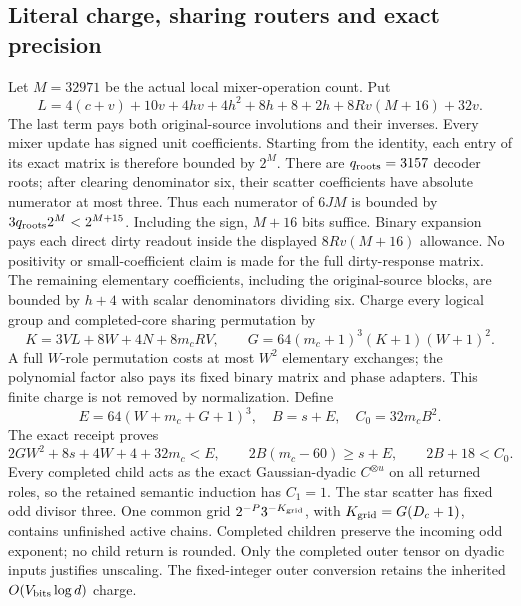 \subsection{Literal charge, sharing routers and exact precision}
Let $M=32971$ be the actual local mixer-operation count. Put
\[
 L=4(c+v)+10v+4hv+4h^2+8h+8+2h
       +8Rv(M+16)+32v.
\]
The last term pays both original-source involutions and their inverses.
Every mixer update has signed unit coefficients. Starting from the identity,
each entry of its exact matrix is therefore bounded by $2^M$.
There are $q_{\rm roots}=3157$ decoder roots; after clearing denominator
six, their scatter coefficients have absolute numerator at most three.
Thus each numerator of $6JM$ is bounded by
$3q_{\rm roots}2^M<2^{M+15}$. Including the sign, $M+16$ bits suffice.
Binary expansion pays each direct dirty readout inside the displayed
$8Rv(M+16)$ allowance. No positivity or small-coefficient claim is made
for the full dirty-response matrix. The remaining elementary coefficients,
including the original-source blocks, are bounded by $h+4$ with
scalar denominators dividing six.
Charge every logical group and completed-core sharing permutation by
\[
 K=3VL+8W+4N+8m_cRV,\qquad
 G=64(m_c+1)^3(K+1)(W+1)^2.
\]
A full $W$-role permutation costs at most $W^2$ elementary exchanges;
the polynomial factor also pays its fixed binary matrix and phase
adapters. This finite charge is not removed by normalization.
Define
\[
 E=64(W+m_c+G+1)^3,\quad B=s+E,\quad C_0=32m_cB^2.
\]
The exact receipt proves
\[
 2GW^2+8s+4W+4+32m_c<E,\qquad
 2B(m_c-60)\ge s+E,\qquad 2B+18<C_0.
\]
Every completed child acts as the exact Gaussian-dyadic $C^{\otimes u}$
on all returned roles, so the retained semantic induction has $C_1=1$.
The star scatter has fixed odd divisor three. One common grid
$2^{-P}3^{-K_{\rm grid}}$, with $K_{\rm grid}=G(D_c+1)$, contains
unfinished active chains. Completed children preserve the incoming odd
exponent; no child return is rounded. Only the completed outer tensor on
dyadic inputs justifies unscaling. The fixed-integer outer conversion
retains the inherited $O(V_{\rm bits}\log d)$ charge.

